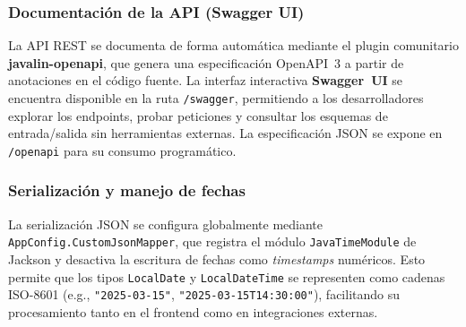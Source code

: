 \subsubsection*{Documentación de la API (Swagger UI)}

La API REST se documenta de forma automática mediante el plugin comunitario \textbf{javalin-openapi}, que genera una especificación OpenAPI~3 a partir de anotaciones en el código fuente. La interfaz interactiva \textbf{Swagger~UI} se encuentra disponible en la ruta \texttt{/swagger}, permitiendo a los desarrolladores explorar los endpoints, probar peticiones y consultar los esquemas de entrada/salida sin herramientas externas. La especificación JSON se expone en \texttt{/openapi} para su consumo programático.

\subsubsection*{Serialización y manejo de fechas}

La serialización JSON se configura globalmente mediante \texttt{AppConfig.CustomJsonMapper}, que registra el módulo \texttt{JavaTimeModule} de Jackson y desactiva la escritura de fechas como \textit{timestamps} numéricos. Esto permite que los tipos \texttt{LocalDate} y \texttt{LocalDateTime} se representen como cadenas ISO-8601 (e.g., \texttt{"2025-03-15"}, \texttt{"2025-03-15T14:30:00"}), facilitando su procesamiento tanto en el frontend como en integraciones externas.
